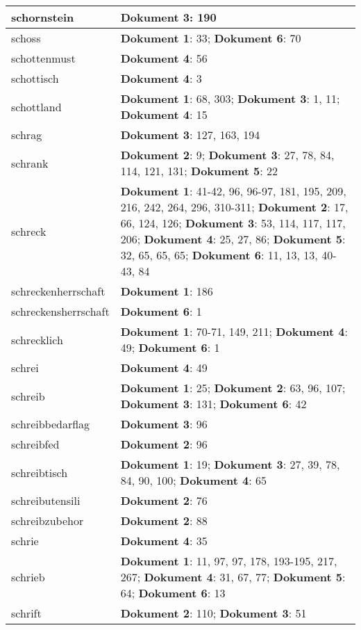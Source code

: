 \documentclass[a5paper]{article}
\begin{document}
\begin{longtable}[l]{|l|p{3in}|}
\hline
schornstein & \textbf{Dokument 3}: 190 \\
\hline
schoss & \textbf{Dokument 1}: 33; \textbf{Dokument 6}: 70 \\
\hline
schottenmust & \textbf{Dokument 4}: 56 \\
\hline
schottisch & \textbf{Dokument 4}: 3 \\
\hline
schottland & \textbf{Dokument 1}: 68, 303; \textbf{Dokument 3}: 1, 11; \textbf{Dokument 4}: 15 \\
\hline
schrag & \textbf{Dokument 3}: 127, 163, 194 \\
\hline
schrank & \textbf{Dokument 2}: 9; \textbf{Dokument 3}: 27, 78, 84, 114, 121, 131; \textbf{Dokument 5}: 22 \\
\hline
schreck & \textbf{Dokument 1}: 41-42, 96, 96-97, 181, 195, 209, 216, 242, 264, 296, 310-311; \textbf{Dokument 2}: 17, 66, 124, 126; \textbf{Dokument 3}: 53, 114, 117, 117, 206; \textbf{Dokument 4}: 25, 27, 86; \textbf{Dokument 5}: 32, 65, 65, 65; \textbf{Dokument 6}: 11, 13, 13, 40-43, 84 \\
\hline
schreckenherrschaft & \textbf{Dokument 1}: 186 \\
\hline
schreckensherrschaft & \textbf{Dokument 6}: 1 \\
\hline
schrecklich & \textbf{Dokument 1}: 70-71, 149, 211; \textbf{Dokument 4}: 49; \textbf{Dokument 6}: 1 \\
\hline
schrei & \textbf{Dokument 4}: 49 \\
\hline
schreib & \textbf{Dokument 1}: 25; \textbf{Dokument 2}: 63, 96, 107; \textbf{Dokument 3}: 131; \textbf{Dokument 6}: 42 \\
\hline
schreibbedarflag & \textbf{Dokument 3}: 96 \\
\hline
schreibfed & \textbf{Dokument 2}: 96 \\
\hline
schreibtisch & \textbf{Dokument 1}: 19; \textbf{Dokument 3}: 27, 39, 78, 84, 90, 100; \textbf{Dokument 4}: 65 \\
\hline
schreibutensili & \textbf{Dokument 2}: 76 \\
\hline
schreibzubehor & \textbf{Dokument 2}: 88 \\
\hline
schrie & \textbf{Dokument 4}: 35 \\
\hline
schrieb & \textbf{Dokument 1}: 11, 97, 97, 178, 193-195, 217, 267; \textbf{Dokument 4}: 31, 67, 77; \textbf{Dokument 5}: 64; \textbf{Dokument 6}: 13 \\
\hline
schrift & \textbf{Dokument 2}: 110; \textbf{Dokument 3}: 51 \\

\end{longtable}
\end{document}
